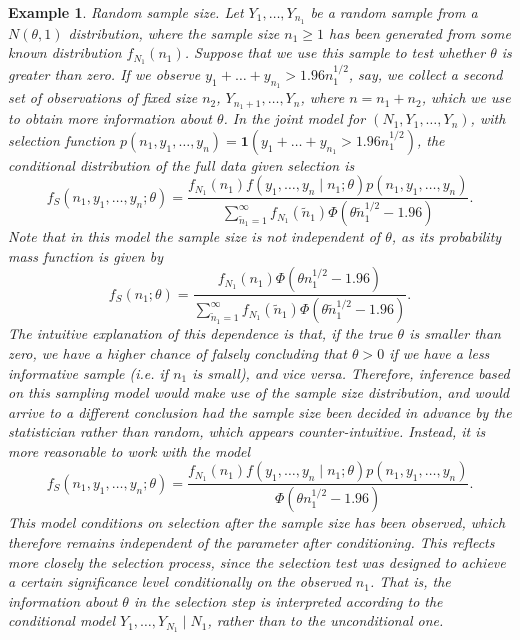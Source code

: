 \documentclass[pdflatex,sn-chicago]{sn-jnl}%
\theoremstyle{thmstyleone}%
\theoremstyle{thmstyletwo}%
\newtheorem{example}{Example}%
\theoremstyle{thmstylethree}%
\begin{document}
\begin{example} \label{EX: random_N}
\textit{Random sample size}. Let $Y_1, \ldots, Y_{n_1}$ be a random sample from a $N(\theta, 1)$ distribution, where the sample size $n_1\geq 1$ has been generated from some known distribution $f_{N_1}(n_1)$. Suppose that we use this sample to test whether $\theta$ is greater than zero. If we observe $y_1 + \ldots  + y_{n_1} > 1.96 n_1^{1/2}$, say, we collect a second set of observations of fixed size $n_2$, $Y_{n_1 + 1}, \ldots, Y_n$, where $n = n_1 + n_2$, which we use to obtain more information about $\theta$. In the joint model for $(N_1, Y_1, \ldots, Y_n)$, with selection function $p(n_1, y_1, \ldots, y_n) = \mathbf{1}(y_1 + \ldots  + y_{n_1} > 1.96 n_1^{1/2})$, the conditional distribution of the full data given selection is
\begin{equation*}
f_S(n_1, y_1, \ldots, y_n; \theta) = \frac{f_{N_1}(n_1) f(y_1, \ldots, y_n\mid n_1 ; \theta) p(n_1, y_1, \ldots, y_n)}{\sum_{\tilde n_1 = 1}^\infty f_{N_1}(\tilde n_1) \Phi(\theta \tilde n_1^{1/2} - 1.96)}.
\end{equation*}
Note that in this model the sample size is not independent of $\theta$, as its probability mass function is given by
\begin{equation*}
f_S(n_1;\theta ) = \frac{f_{N_1}(n_1) \Phi(\theta n_1^{1/2} - 1.96)}{\sum_{\tilde n_1 = 1}^\infty f_{N_1}(\tilde n_1) \Phi(\theta \tilde n_1^{1/2} - 1.96)}.
\end{equation*}
The intuitive explanation of this dependence is that, if the true $\theta$ is smaller than zero, we have a higher chance of falsely concluding that $\theta > 0$ if we have a less informative sample (i.e. if $n_1$ is small), and vice versa. Therefore, inference based on this sampling model would make use of the sample size distribution, and would arrive to a different conclusion had the sample size been decided in advance by the statistician rather than random, which appears counter-intuitive. Instead, it is more reasonable to work with the model
\begin{equation*} \label{EQ: sample size}
f_S(n_1, y_1, \ldots, y_n ; \theta) = \frac{f_{N_1}(n_1) f(y_1, \ldots, y_n\mid n_1 ; \theta) p(n_1, y_1, \ldots, y_n)}{\Phi(\theta n_1^{1/2} - 1.96)}.
\end{equation*}
This model conditions on selection \textit{after} the sample size has been observed, which therefore remains independent of the parameter after conditioning. This reflects more closely the selection process, since the selection test was designed to achieve a certain significance level conditionally on the observed $n_1$. That is, the information about $\theta$ in the selection step is interpreted according to the conditional model $Y_1, \ldots, Y_{N_1}\mid N_1$, rather than to the unconditional one.
\end{example}
\end{document}
